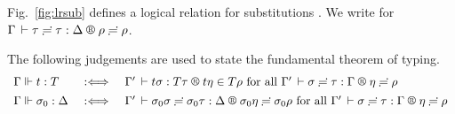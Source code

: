 \documentclass[acmsmall,screen]{acmart}\settopmatter{}
\newcommand{\LONGVERSION}[1]{}
\begin{document}
Fig.~\ref{fig:lrsub} defines a logical relation for substitutions
\fbox{$\LRSub \Gamma \sigma \tau \Delta \eta \rho$}.
We write \fbox{$\LRS \Gamma \tau \Delta \rho$} for $\LRSub \Gamma \tau \tau \Delta \rho \rho$.

\LONGVERSION{ %
\begin{lemma}[Properties of the logical relation for substitutions]
  \label{lem:wklrsub}
  \bla \\
  Let $\LRSub \Gamma \sigma \tau \Delta \eta \rho$. Then:
  \begin{enumerate}
  \item Well-typedness: $\Gamma \der \sigma : \Delta$
   and $\Gamma \der \sigma = \sigma \eeq \tau : \Delta$
   [which in turn implies $\Gamma \der \tau : \Delta$].
  \item Weakening:
  If\/ $\xi : \Gamma' \leq \Gamma$ then
  $\LRSub{\Gamma'}{\sigma\xi}{\tau\xi}{\Delta}\eta\rho$.
  \item Resurrection:
  $\LRS {\resurrect\Gamma} \tau {\resurrect\Delta} \rho$.
  \item \label{it:sizesub} Size substitution:
  If\/ $\resurrect\Delta \der a : \Size$ then $a\eta \in \SIZE$.
  \end{enumerate}
\end{lemma}
} %
\LONGVERSION{
\begin{proof}
  For part (\ref{it:sizesub}), the only interesting case $a = \ind i + o$ can be proved by observing that $\eta(i) \in \SIZE$.
\end{proof}
} %

The following judgements are used to state the fundamental theorem of typing.
\[
\begin{array}{l@{\quad}l@{\quad}l}
  \Gamma \valid t : T & \defas & %
    \LR {\Gamma'} {t \sigma} {T \tau} {t \eta} {T \rho}
    \mforall \LRSub {\Gamma'} \sigma \tau \Gamma \eta \rho
\\[1ex]
  \Gamma \valid \sigma_0 : \Delta & \defas &
    \LRSub {\Gamma'} {\sigma_0 \sigma} {\sigma_0 \tau} \Delta {\sigma_0 \eta} {\sigma_0 \rho}
    \mforall \LRSub {\Gamma'} {\sigma} {\tau} \Gamma {\eta} {\rho}
\end{array}
\]
\end{document}
